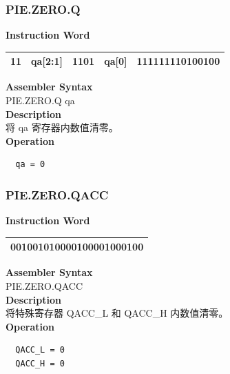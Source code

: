 \newpage
\subsubsection{PIE.ZERO.Q}\label{instruction:PIEZEROQ}
\setlength\tabcolsep{6pt}
\textbf{Instruction Word} \\
\begin{tabular}{|c|c|c|c|c|}
	\hline
	11 & qa[2:1] & 1101 & qa[0] & 111111110100100 \\
	\hline
\end{tabular}

\textbf{Assembler Syntax} \\
PIE.ZERO.Q qa \\
\textbf{Description} \\
将 qa 寄存器内数值清零。\\
\textbf{Operation}
\begin{lstlisting}
  qa = 0
\end{lstlisting}

\newpage
\subsubsection{PIE.ZERO.QACC}\label{instruction:PIEZEROQACC}
\setlength\tabcolsep{6pt}
\textbf{Instruction Word} \\
\begin{tabular}{|c|}
	\hline
	001001010000100001000100 \\
	\hline
\end{tabular}

\textbf{Assembler Syntax} \\
PIE.ZERO.QACC  \\
\textbf{Description} \\
将特殊寄存器 QACC\_L 和 QACC\_H 内数值清零。\\
\textbf{Operation}
\begin{lstlisting}
  QACC_L = 0
  QACC_H = 0
\end{lstlisting}

